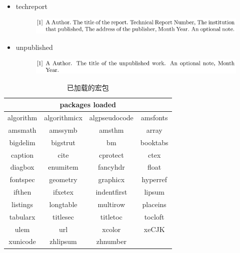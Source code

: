 \documentclass{fieldpractice-geo}
\begin{document}
\begin{itemize}
\begin{figure}[H]
		\caption*{}
	\end{figure}
	\item techreport
	\begin{figure}[H]
		\centering
		\includegraphics[width=1\textwidth]{example-figures/techreport.png}
		\caption*{}
	\end{figure}
	\item unpublished
	\begin{figure}[H]
		\centering
		\includegraphics[width=1\textwidth]{example-figures/unpublished.png}
		\caption*{}
	\end{figure}
\end{itemize}
\begin{table}[htbp]
	\centering
	\caption{已加载的宏包}
	\begin{tabular}{cccc}
		\toprule
		\multicolumn{4}{c}{packages loaded} \\
		\midrule
		algorithm & algorithmicx & algpseudocode & amsfonts \\
		amsmath & amssymb & amsthm & array \\
		bigdelim & bigstrut & bm    & booktabs \\
		caption & cite  & cprotect & ctex \\
		diagbox & enumitem & fancyhdr & float \\
		fontspec & geometry & graphicx & hyperref \\
		ifthen & ifxetex & indentfirst & lipsum \\
		listings & longtable & multirow & placeins \\
		tabularx & titlesec & titletoc & tocloft \\
		ulem  & url   & xcolor & xeCJK \\
		xunicode & zhlipsum & zhnumber &  \\
		\bottomrule
	\end{tabular}%
	\label{tab:已加载的宏包}%
\end{table}%
\end{document}
